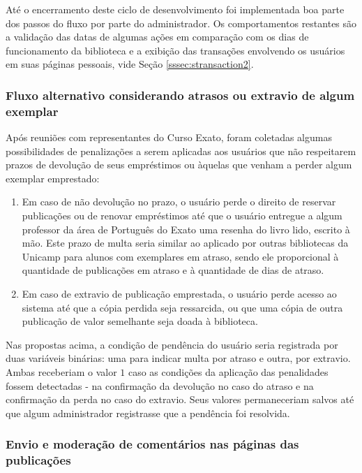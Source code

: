 \documentclass[a4paper]{article}
\begin{document}
Até o encerramento deste ciclo de desenvolvimento foi implementada boa parte dos passos do fluxo por parte do administrador. Os comportamentos restantes são a validação das datas de algumas ações em comparação com os dias de funcionamento da biblioteca e a exibição das transações envolvendo os usuários em suas páginas pessoais, vide Seção \ref{sssec:stransaction2}.

\subsubsection{Fluxo alternativo considerando atrasos ou extravio de algum exemplar}\label{sssec:overdue_or_lost}
Após reuniões com representantes do Curso Exato, foram coletadas algumas possibilidades de penalizações a serem aplicadas aos usuários que não respeitarem prazos de devolução de seus empréstimos ou àquelas que venham a perder algum exemplar emprestado:

\begin{enumerate}
\item Em caso de não devolução no prazo, o usuário perde o direito de reservar publicações ou de renovar empréstimos até que o usuário entregue a algum professor da área de Português do Exato uma resenha do livro lido, escrito à mão. Este prazo de multa seria similar ao aplicado por outras bibliotecas da Unicamp para alunos com exemplares em atraso, sendo ele proporcional à quantidade de publicações em atraso e à quantidade de dias de atraso.
\item Em caso de extravio de publicação emprestada, o usuário perde acesso ao sistema até que a cópia perdida seja ressarcida, ou que uma cópia de outra publicação de valor semelhante seja doada à biblioteca.
\end{enumerate}

Nas propostas acima, a condição de pendência do usuário seria registrada por duas variáveis binárias: uma para indicar multa por atraso e outra, por extravio. Ambas receberiam o valor $1$ caso as condições da aplicação das penalidades fossem detectadas - na confirmação da devolução no caso do atraso e na confirmação da perda no caso do extravio. Seus valores permaneceriam salvos até que algum administrador registrasse que a pendência foi resolvida.

\subsubsection{Envio e moderação de comentários nas páginas das publicações}
\end{document}
